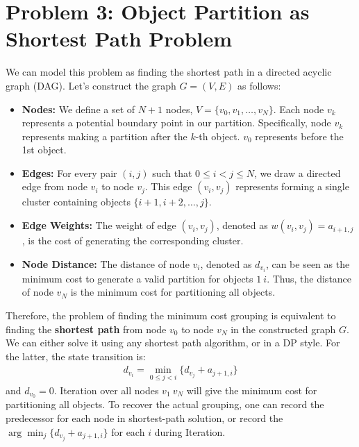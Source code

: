 \documentclass[11pt, a4paper, oneside]{memoir}
\begin{document}
\chapter{Problem 3: Object Partition as Shortest Path Problem}
We can model this problem as finding the shortest path in a directed acyclic graph (DAG).
Let's construct the graph $G = (V, E)$ as follows:
\begin{itemize}
    \item \textbf{Nodes:} We define a set of $N+1$ nodes, $V = \{v_0, v_1, \dots, v_N\}$.
    Each node $v_k$ represents a potential boundary point in our partition.
    Specifically, node $v_k$ represents making a partition after the $k$-th object.
    $v_0$ represents before the 1st object.
    \item \textbf{Edges:} For every pair $(i, j)$ such that $0 \le i < j \le N$,
    we draw a directed edge from node $v_i$ to node $v_j$.
    This edge $(v_i, v_j)$ represents forming a single cluster containing objects $\{i+1, i+2, \dots, j\}$.
    \item \textbf{Edge Weights:} The weight of edge $(v_i, v_j)$, denoted as $w(v_i, v_j)= a_{i+1, j}$,
    is the cost of generating the corresponding cluster.
    \item \textbf{Node Distance:} The distance of node $v_i$, denoted as $d_{v_i}$,
    can be seen as the minimum cost to generate a valid partition for objects $1~i$.
    Thus, the distance of node $v_N$ is the minimum cost for partitioning all objects.
\end{itemize}
Therefore, the problem of finding the minimum cost grouping is equivalent to finding the \textbf{shortest path}
from node $v_0$ to node $v_N$ in the constructed graph $G$. We can either solve it using any shortest path algorithm,
or in a DP style. For the latter, the state transition is:
\begin{align*}
  d_{v_i} = \min_{0 \le j < i} \{d_{v_j} + a_{j+1, i}\}
\end{align*}
and $d_{v_0} = 0$. Iteration over all nodes $v_1~v_N$ will give the minimum cost for partitioning all objects.
To recover the actual grouping, one can record the predecessor for each node in shortest-path solution,
or record the $\arg \min_{j} \{d_{v_j} + a_{j+1, i}\}$ for each $i$ during Iteration.
\end{document}
